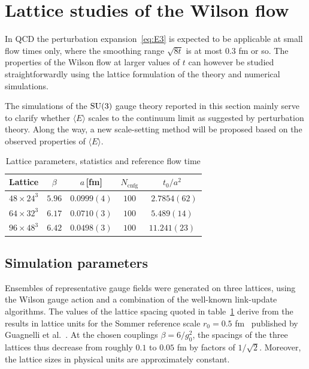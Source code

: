 \section{Lattice studies of the Wilson flow}

In QCD the perturbation expansion~\eqref{eq:E3}
is expected to be applicable
at small flow times only, where the smoothing range
$\sqrt{8t}$ is at most $0.3$ fm or so.
The properties of the Wilson flow at larger values of $t$ can however
be studied straightforwardly using the lattice formulation of the
theory and numerical simulations.

The simulations of the $\mathrm{SU(3)}$ gauge theory
reported in this section mainly serve to clarify whether
$\langle E\rangle$ scales to the continuum limit as
suggested by perturbation theory. Along the way,
a new scale-setting method will be proposed based on the
observed properties of $\langle E\rangle$.

\begin{table}[ht]
\centering
\caption{Lattice parameters, statistics and reference flow time}
\label{tab:params}
\begin{tabular}{ccccc}
\hline
Lattice & $\beta$ & $a$\,[fm] & $N_{\mathrm{cnfg}}$ & $t_0/a^2$ \\
\hline
$48\times24^3$ & $5.96$ & $0.0999(4)$ & $100$ & $\phantom{0}2.7854(62)$ \\
$64\times32^3$ & $6.17$ & $0.0710(3)$ & $100$ & $\phantom{0}5.489(14)\phantom{0}$ \\
$96\times48^3$ & $6.42$ & $0.0498(3)$ & $100$ & $11.241(23)$ \\
\hline
\end{tabular}
\end{table}

\subsection{Simulation parameters}

Ensembles of representative gauge fields were
generated on three lattices, using the Wilson gauge action
and a combination of the well-known link-update algorithms.
The values of the lattice spacing quoted in table~\ref{tab:params}
derive from the results in lattice units for the Sommer
reference scale $r_0=0.5$ fm~\cite{SommerScale}
published by Guagnelli et al.~\cite{GuagnelliEtAl}.
At the chosen couplings $\beta=6/g_0^2$,
the spacings of the three lattices thus
decrease from roughly $0.1$ to $0.05$ fm by factors of $1/\sqrt{2}$.
Moreover, the lattice sizes in physical units are approximately
constant.

